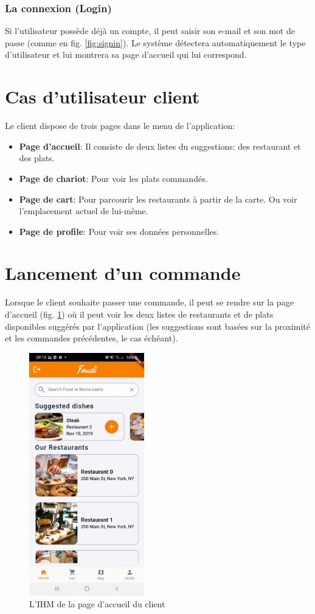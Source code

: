 \documentclass[french, a4paper, 12pt]{report}
\begin{document}
		\subsubsection{La connexion (Login)} Si l'utilisateur possède déjà un compte, il peut saisir son e-mail et son mot de passe (comme en fig. \ref{fig:signin}). Le système détectera automatiquement le type d'utilisateur et lui montrera sa page d'accueil qui lui correspond.
		 
	\newpage
	\section{Cas d'utilisateur client} Le client dispose de trois pages dans le menu de l'application:
		\begin{itemize}
			\item \textbf{Page d'accueil}: Il consiste de deux listes du suggestions: des restaurant et des plats.
			\item \textbf{Page de chariot}: Pour voir les plats commandés.
			\item \textbf{Page de cart}: Pour parcourir les restaurants à partir de la carte. Ou voir l'emplacement actuel de lui-même.
			\item \textbf{Page de profile}: Pour voir ses données personnelles.
		\end{itemize}
		\section{Lancement d'un commande}
			Lorsque le client souhaite passer une commande, il peut se rendre sur la page d'accueil (fig. \ref{fig:clihp}) où il peut voir les deux listes de restaurants et de plats disponibles suggérés par l'application (les suggestions sont basées sur la proximité et les commandes précédentes, le cas échéant).
			
			\begin{figure}[h!]
			\center
			\includegraphics[width=5cm]{screenshots/ClientViews/Homepage.jpg}
			\caption{L'IHM de la page d'accueil du client}
			\label{fig:clihp}
		\end{figure}
\end{document}

